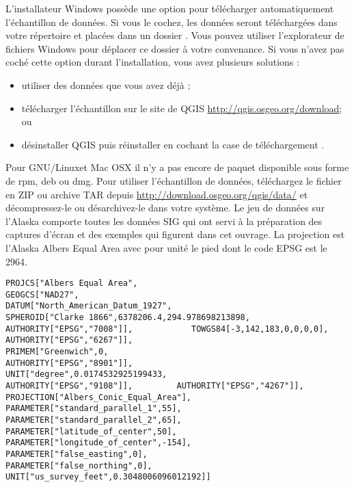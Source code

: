 \win L'installateur Windows poss\`ede une option pour t\'el\'echarger automatiquement l'\'echantillon de donn\'ees. Si vous le cochez, les donn\'ees seront t\'el\'echarg\'ees dans votre r\'epertoire  et plac\'ees dans un dossier . Vous pouvez utiliser l'explorateur de fichiers Windows pour d\'eplacer ce dossier \`a votre convenance. Si vous n'avez pas coch\'e cette option durant l'installation, vous avez plusieurs solutions : 
\begin{itemize} 
\item utiliser des donn\'ees que vous avez d\'ej\`a ;
\item t\'el\'echarger l'\'echantillon sur le site de QGIS \url{http://qgis.osgeo.org/download}; ou 
\item d\'esinstaller QGIS puis r\'einstaller en cochant la case de t\'el\'echargement .
\end{itemize}

\nix \osx Pour GNU/Linuxet Mac OSX il n'y a pas encore de paquet disponible sous forme de rpm, deb ou dmg. Pour utiliser l'\'echantillon de donn\'ees, t\'el\'echargez le fichier  en ZIP ou archive TAR depuis \url{http://download.osgeo.org/qgis/data/} et d\'ecompressez-le ou d\'esarchivez-le dans votre syst\`eme. Le jeu de donn\'ees sur l'Alaska comporte toutes les donn\'ees SIG qui ont servi \`a la pr\'eparation des captures d'\'ecran et des exemples qui figurent dans cet ouvrage. La projection est l'Alaska Albers Equal Area avec pour unit\'e le pied dont le code EPSG est le 2964.

\begin{verbatim}
PROJCS["Albers Equal Area",  
GEOGCS["NAD27",  
DATUM["North_American_Datum_1927",  
SPHEROID["Clarke 1866",6378206.4,294.978698213898,  
AUTHORITY["EPSG","7008"]],            TOWGS84[-3,142,183,0,0,0,0],             AUTHORITY["EPSG","6267"]],   
PRIMEM["Greenwich",0,   
AUTHORITY["EPSG","8901"]],   
UNIT["degree",0.0174532925199433,   
AUTHORITY["EPSG","9108"]],         AUTHORITY["EPSG","4267"]],   
PROJECTION["Albers_Conic_Equal_Area"],   
PARAMETER["standard_parallel_1",55],   
PARAMETER["standard_parallel_2",65],   
PARAMETER["latitude_of_center",50],   
PARAMETER["longitude_of_center",-154],   
PARAMETER["false_easting",0],   
PARAMETER["false_northing",0],   
UNIT["us_survey_feet",0.3048006096012192]] \end{verbatim}


